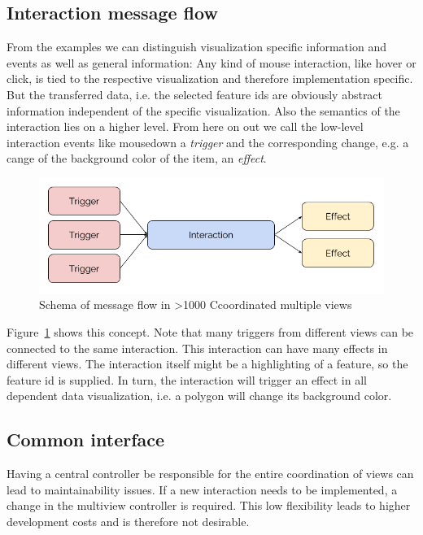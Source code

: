 \documentclass{article}
\newcommand\hmm[1]{\ifnum\ifhmode\spacefactor\else2000\fi>1000 \uppercase{#1}\else#1\fi}
\newcommand{\cmvs}{\hmm{c}oordinated multiple views}
\begin{document}
\subsection{Interaction message flow}

From the examples we can distinguish visualization specific information and events as well as general information:
Any kind of mouse interaction, like hover or click, is tied to the respective visualization and therefore implementation specific.
But the transferred data, i.e. the selected feature ids are obviously abstract information independent of the specific visualization.
Also the semantics of the interaction lies on a higher level. 
From here on out we call the low-level interaction events like mousedown a \emph{trigger} and the corresponding change, e.g. a cange of the background color of the item, an \emph{effect}.

\begin{figure}[h!]
  \centering
  \includegraphics[width=\textwidth]{images/trigger-effect.png}
  \caption{Schema of message flow in \cmvs{}}
  \label{fig:concept:trigger-effect}
\end{figure}


Figure~\ref{fig:concept:trigger-effect} shows this concept.
Note that many triggers from different views can be connected to the same interaction.
This interaction can have many effects in different views.
The interaction itself might be a highlighting of a feature, so the feature id is supplied.
In turn, the interaction will trigger an effect in all dependent data visualization, i.e. a polygon will change its background color.


\subsection{Common interface}

Having a central controller be responsible for the entire coordination of views can lead to maintainability issues.
If a new interaction needs to be implemented, a change in the multiview controller is required.
This low flexibility leads to higher development costs and is therefore not desirable.
\end{document}
